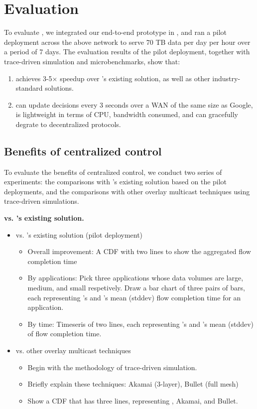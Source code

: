 \section{Evaluation}
\label{sec:evaluation}

To evaluate \name, we integrated our end-to-end prototype in \company, and ran a pilot deployment across the above network to serve 70 TB data per day per hour  over a period of 7 days.
The evaluation results of the pilot deployment, together with trace-driven simulation and microbenchmarks, show that:
\begin{enumerate}
\item \name achieves 3-5$\times$ speedup over \company's existing solution, as well as other industry-standard solutions.
\item \name can update decisions every 3 seconds over a WAN of the same size as Google, is lightweight in terms of CPU, bandwidth consumed, and can gracefully degrate to decentralized protocols.
\end{enumerate}

\subsection{Benefits of centralized control}
\label{subsec:evaluation:centralized}

To evaluate the benefits of centralized control, we conduct two series of experiments: the comparisons with \company's existing solution based on the pilot deployments, and the comparisons with other overlay multicast techniques using trace-driven simulations.

\textbf{\name vs. \company's existing solution.}




\begin{itemize}
\item \name vs. \company's existing solution (pilot deployment)
\begin{itemize}
\item Overall improvement: A CDF with two lines to show the aggregated flow completion time
\item By applications: Pick three applications whose data volumes are large, medium, and small respetively. Draw a bar chart of three pairs of bars, each representing \name's and \company's mean (stddev) flow completion time for an application.
\item By time: Timeseris of two lines, each representing \name's and \company's mean (stddev) of flow completion time.
\end{itemize}

\item \name vs. other overlay multicast techniques
\begin{itemize}
\item Begin with the methodology of trace-driven simulation.
\item Briefly explain these techniques: Akamai (3-layer), Bullet (full mesh)
\item Show a CDF that has three lines, representing \name, Akamai, and Bullet.
\end{itemize}

\end{itemize}

